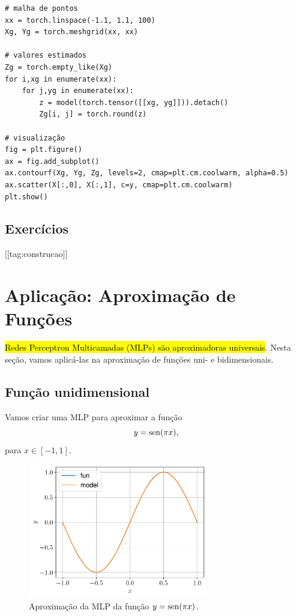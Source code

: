 \begin{lstlisting}
# malha de pontos
xx = torch.linspace(-1.1, 1.1, 100)
Xg, Yg = torch.meshgrid(xx, xx)

# valores estimados
Zg = torch.empty_like(Xg)
for i,xg in enumerate(xx):
    for j,yg in enumerate(xx):
        z = model(torch.tensor([[xg, yg]])).detach()
        Zg[i, j] = torch.round(z)

# visualização
fig = plt.figure()
ax = fig.add_subplot()
ax.contourf(Xg, Yg, Zg, levels=2, cmap=plt.cm.coolwarm, alpha=0.5)
ax.scatter(X[:,0], X[:,1], c=y, cmap=plt.cm.coolwarm)
plt.show()
\end{lstlisting}

\subsection{Exercícios}
[[tag:construcao]]


\section{Aplicação: Aproximação de Funções}\label{cap_mlp_sec_apfun}

\hl{Redes Perceptron Multicamadas (MLPs) são aproximadoras universais}. Nesta seção, vamos aplicá-las na aproximação de funções uni- e bidimensionais.

\subsection{Função unidimensional}\label{mlp_apfun_1d}

Vamos criar uma MLP para aproximar a função
\begin{equation}
  y = \operatorname{sen}(\pi x),
\end{equation}
para $x\in [-1,1]$.

\begin{figure}[H]
  \centering
  \includegraphics[width=0.7\textwidth]{cap_mlp/dados/fig_mlp_apfun_1d/fig}
  \caption{Aproximação da MLP da função $y = \operatorname{sen}(\pi x)$.}
  \label{fig:mlp_mlp_apfun_1d}
\end{figure}

